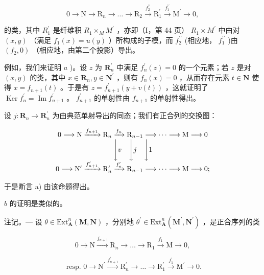 \[
0 \rightarrow \mathrm{N} \rightarrow \mathrm{R} _ {n} \rightarrow \dots \rightarrow \mathrm{R} _ {2} \xrightarrow {f _ {2} ^ {\prime \prime}} \mathrm{R} _ {1} ^ {\prime} \xrightarrow {f _ {1} ^ {\prime \prime}} \mathrm{M} ^ {\prime} \rightarrow 0,
\]

的类，其中 \(R_{1}^{\prime}\) 是纤维积 \(R_{1} \times_{M} M^{\prime}\) ，亦即（I，第 44 页） \(R_{1} \times M^{\prime}\) 中由对 \((x, y)\) （满足 \(f_{1}(x) = u(y)\) ）所构成的子模，而 \(f_{2}^{\prime\prime}\) (相应地， \(f_{1}^{\prime\prime}\) )由 \((f_{2}, 0)\) （相应地，由第二个投影）导出。

例如，我们来证明 \(a\) )。设 \(z\) 为 \(\mathbf{R}_{n}^{\prime}\) 中满足 \(f_{n}^{\prime}(z)=0\) 的一个元素；若 \(z\) 是对 \((x,y)\) 的类，其中 \(x\in\mathbf{R}_{n},y\in\mathbf{N}^{\prime}\) ，则有 \(f_{n}(x)=0\) ，从而存在元素 \(t\in\mathbf{N}\) 使得 \(x=f_{n+1}(t)\) 。于是有 \(z=f_{n+1}^{\prime}(y+v(t))\) ，这就证明了 \(\operatorname{Ker} f_{n}^{\prime}=\operatorname{Im} f_{n+1}^{\prime}\) 。 \(f_{n+1}^{\prime}\) 的单射性由 \(f_{n+1}\) 的单射性得出。

设 \(j: \mathbf{R}_{n} \to \mathbf{R}_{n}^{\prime}\) 为由典范单射导出的同态；我们有正合列的交换图：

\[
\begin{array}{c} 0 \longrightarrow \mathrm{N} \xrightarrow {f _ {n + 1}} \mathrm{R} _ {n} \xrightarrow {f _ {n}} \mathrm{R} _ {n - 1} \longrightarrow \dots \longrightarrow \mathrm{M} \longrightarrow 0 \\ \Biggl \downarrow v \quad \Biggl \downarrow j \quad \Biggl \downarrow 1 \\ 0 \longrightarrow \mathrm{N} ^ {\prime} \xrightarrow {f _ {n + 1} ^ {\prime}} \mathrm{R} _ {n} ^ {\prime} \xrightarrow {f _ {n} ^ {\prime}} \mathrm{R} _ {n - 1} \longrightarrow \dots \longrightarrow \mathrm{M} \longrightarrow 0; \end{array}
\]

于是断言 a) 由该命题得出。

 \(b\) 的证明是类似的。

注记。--- 设 \(\theta\in\mathrm{Ext}_{\mathbf{A}}^{n}(\mathbf{M},\mathbf{N})\) ，分别地 \(\theta^{\prime}\in\mathrm{Ext}_{\mathbf{A}}^{n}(\mathbf{M}^{\prime},\mathbf{N}^{\prime})\) ，是正合序列的类

\[
0 \rightarrow \mathrm{N} \xrightarrow {f _ {n + 1}} \mathrm{R} _ {n} \rightarrow \dots \rightarrow \mathrm{R} _ {1} \xrightarrow {f _ {1}} \mathrm{M} \rightarrow 0,
\]

\[
\text { resp. } 0 \to \mathrm{N} ^ {\prime} \xrightarrow {f _ {n + 1} ^ {\prime}} \mathrm{R} _ {n} ^ {\prime} \to \dots \to \mathrm{R} _ {1} ^ {\prime} \xrightarrow {f _ {1} ^ {\prime}} \mathrm{M} ^ {\prime} \to 0.
\]

